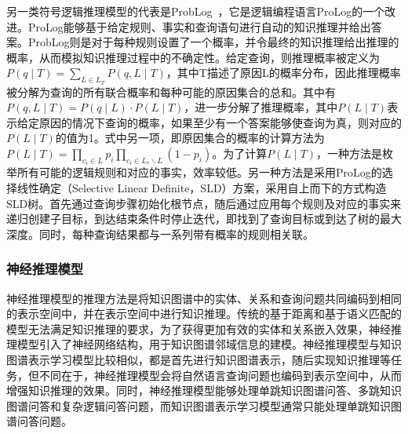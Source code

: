 \documentclass[algorithmlist, AutoFakeBold, AutoFakeSlant, figurelist, tablelist, nomlist, engineering]{seuthesix}
\begin{document}
另一类符号逻辑推理模型的代表是ProbLog~\cite{de2007problog}，它是逻辑编程语言ProLog的一个改进。ProLog能够基于给定规则、事实和查询语句进行自动的知识推理并给出答案。ProbLog则是对于每种规则设置了一个概率，并令最终的知识推理给出推理的概率，从而模拟知识推理过程中的不确定性。给定查询，则推理概率被定义为$P\left(q \mid T\right)=\sum_{L \in L_T} P(q, L \mid T)$，其中T描述了原因L的概率分布，因此推理概率被分解为查询的所有联合概率和每种可能的原因集合的总和。其中有$P(q, L \mid T)=P(q \mid L) \cdot P(L \mid T)$，进一步分解了推理概率，其中$P(L \mid T)$表示给定原因的情况下查询的概率，如果至少有一个答案能够使查询为真，则对应的$P(L \mid T)$的值为1。式中另一项，即原因集合的概率的计算方法为$P(L \mid T)=\prod_{c_i \in L} p_i \prod_{c_i \in L_r \backslash L}\left(1-p_i\right)$。为了计算$P(L \mid T)$，一种方法是枚举所有可能的逻辑规则和对应的事实，效率较低。另一种方法是采用ProLog的选择线性确定（Selective Linear Definite，SLD）方案，采用自上而下的方式构造SLD树。首先通过查询步骤初始化根节点，随后通过应用每个规则及对应的事实来递归创建子目标，到达结束条件时停止迭代，即找到了查询目标或到达了树的最大深度。同时，每种查询结果都与一系列带有概率的规则相关联。

\subsubsection{神经推理模型}
神经推理模型的推理方法是将知识图谱中的实体、关系和查询问题共同编码到相同的表示空间中，并在表示空间中进行知识推理。传统的基于距离和基于语义匹配的模型无法满足知识推理的要求，为了获得更加有效的实体和关系嵌入效果，神经推理模型引入了神经网络结构，用于知识图谱邻域信息的建模。神经推理模型与知识图谱表示学习模型比较相似，都是首先进行知识图谱表示，随后实现知识推理等任务，但不同在于，神经推理模型会将自然语言查询问题也编码到表示空间中，从而增强知识推理的效果。同时，神经推理模型能够处理单跳知识图谱问答、多跳知识图谱问答和复杂逻辑问答问题，而知识图谱表示学习模型通常只能处理单跳知识图谱问答问题。
\end{document}
